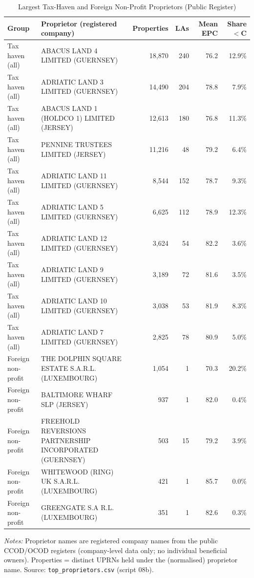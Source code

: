 \begin{table}[htbp]
\centering
\caption{Largest Tax-Haven and Foreign Non-Profit Proprietors (Public Register)}
\label{tab:offshore_top_proprietors}
\scriptsize
\begin{tabular}{llrrrr}
\toprule
Group & Proprietor (registered company) & Properties & LAs & Mean EPC & Share $<$C \\
\midrule
Tax haven (all) & ABACUS LAND 4 LIMITED (GUERNSEY) & 18,870 & 240 & 76.2 & 12.9\% \\
Tax haven (all) & ADRIATIC LAND 3 LIMITED (GUERNSEY) & 14,490 & 204 & 78.8 & 7.9\% \\
Tax haven (all) & ABACUS LAND 1 (HOLDCO 1) LIMITED (JERSEY) & 12,613 & 180 & 76.8 & 11.3\% \\
Tax haven (all) & PENNINE TRUSTEES LIMITED (JERSEY) & 11,216 & 48 & 79.2 & 6.4\% \\
Tax haven (all) & ADRIATIC LAND 11 LIMITED (GUERNSEY) & 8,544 & 152 & 78.7 & 9.3\% \\
Tax haven (all) & ADRIATIC LAND 5 LIMITED (GUERNSEY) & 6,625 & 112 & 78.9 & 12.3\% \\
Tax haven (all) & ADRIATIC LAND 12 LIMITED (GUERNSEY) & 3,624 & 54 & 82.2 & 3.6\% \\
Tax haven (all) & ADRIATIC LAND 9 LIMITED (GUERNSEY) & 3,189 & 72 & 81.6 & 3.5\% \\
Tax haven (all) & ADRIATIC LAND 10 LIMITED (GUERNSEY) & 3,038 & 53 & 81.9 & 8.3\% \\
Tax haven (all) & ADRIATIC LAND 7 LIMITED (GUERNSEY) & 2,825 & 78 & 80.9 & 5.0\% \\
Foreign non-profit & THE DOLPHIN SQUARE ESTATE S.A.R.L. (LUXEMBOURG) & 1,054 & 1 & 70.3 & 20.2\% \\
Foreign non-profit & BALTIMORE WHARF SLP (JERSEY) & 937 & 1 & 82.0 & 0.4\% \\
Foreign non-profit & FREEHOLD REVERSIONS PARTNERSHIP INCORPORATED  (GUERNSEY) & 503 & 15 & 79.2 & 3.9\% \\
Foreign non-profit & WHITEWOOD (RING) UK S.A.R.L. (LUXEMBOURG) & 421 & 1 & 85.7 & 0.0\% \\
Foreign non-profit & GREENGATE S.A R.L. (LUXEMBOURG) & 351 & 1 & 82.6 & 0.3\% \\
\bottomrule
\end{tabular}
\begin{minipage}{0.95\textwidth}
\vspace{4pt}
\footnotesize
\textit{Notes:} Proprietor names are registered company names from the public
CCOD/OCOD registers (company-level data only; no individual beneficial owners).
Properties = distinct UPRNs held under the (normalised) proprietor name.
Source: \texttt{top\_proprietors.csv} (script 08b).
\end{minipage}
\end{table}
